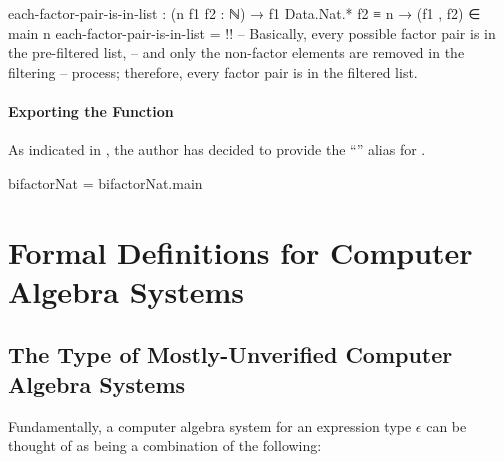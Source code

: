 \documentclass{report}
\begin{document}
\begin{code}
    each-factor-pair-is-in-list :
      (n f1 f2 : ℕ) →
      f1 Data.Nat.* f2 ≡ n →
      (f1 , f2) ∈ main n
    each-factor-pair-is-in-list = {!!}
    -- Basically, every possible factor pair is in the pre-filtered list,
    -- and only the non-factor elements are removed in the filtering
    -- process; therefore, every factor pair is in the filtered list.
\end{code}

\subsection{Exporting the Function}
As indicated in , the author has decided to provide the ``'' alias for .

\begin{code}
bifactorNat = bifactorNat.main
\end{code}

\part{Formal Definitions for Computer Algebra Systems}

\chapter{The Type of Mostly-Unverified Computer Algebra Systems}
Fundamentally, a computer algebra system for an expression type \(\epsilon\) can be thought of as being a combination of the following:
\end{document}
